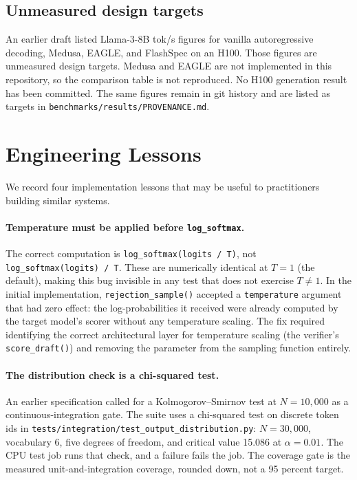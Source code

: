 \documentclass[11pt]{article}
\begin{document}
\subsection{Unmeasured design targets}
\label{sec:targets}

An earlier draft listed Llama-3-8B tok/s figures for vanilla autoregressive
decoding, Medusa, EAGLE, and FlashSpec on an H100.
Those figures are unmeasured design targets.
Medusa and EAGLE are not implemented in this repository, so the comparison
table is not reproduced.
No H100 generation result has been committed.
The same figures remain in git history and are listed as targets in
\texttt{benchmarks/results/PROVENANCE.md}.

\section{Engineering Lessons}
\label{sec:lessons}

We record four implementation lessons that may be useful to practitioners
building similar systems.

\paragraph{Temperature must be applied before \texttt{log\_softmax}.}
The correct computation is \texttt{log\_softmax(logits / T)}, not
\texttt{log\_softmax(logits) / T}.
These are numerically identical at $T=1$ (the default), making this bug
invisible in any test that does not exercise $T \neq 1$.
In the initial implementation, \texttt{rejection\_sample()} accepted a
\texttt{temperature} argument that had zero effect: the log-probabilities
it received were already computed by the target model's scorer without any
temperature scaling.
The fix required identifying the correct architectural layer for temperature
scaling (the verifier's \texttt{score\_draft()}) and removing the parameter
from the sampling function entirely.

\paragraph{The distribution check is a chi-squared test.}
An earlier specification called for a Kolmogorov--Smirnov test at
$N=10{,}000$ as a continuous-integration gate.
The suite uses a chi-squared test on discrete token ids in
\texttt{tests/integration/test\_output\_distribution.py}:
$N=30{,}000$, vocabulary 6, five degrees of freedom, and critical value
15.086 at $\alpha=0.01$.
The CPU test job runs that check, and a failure fails the job.
The coverage gate is the measured unit-and-integration coverage,
rounded down, not a 95 percent target.
\end{document}

